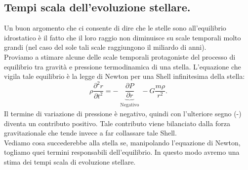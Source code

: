 \subsection{Tempi scala dell'evoluzione stellare.}
\label{subsec:Equilibrio idrostatico stellare.}

Un buon argomento che ci consente di dire che le stelle sono all'equilibrio idrostatico è il fatto che il loro raggio non diminuisce su scale temporali molto grandi (nel caso del sole tali scale raggiungono il miliardo di anni). \\
Proviamo a stimare alcune delle scale temporali protagoniste del processo di equilibrio tra gravità e pressione termodinamica di una stella. L'equazione che vigila tale equilibrio è la legge di Newton per una Shell infinitesima della stella:
\[
	\rho\frac{\partial^2r}{\partial t^2} 
	=
	-\underbrace{\frac{\partial P}{\partial r}}_
	{\substack{\text{Negativo}}}
	-G \frac{m\rho}{r^2}
.\] 
Il termine di variazione di pressione è negativo, quindi con l'ulteriore segno (-) diventa un contributo positivo. Tale contributo viene bilanciato dalla forza gravitazionale che tende invece a far collassare tale Shell. \\
Vediamo cosa succederebbe alla stella se, manipolando l'equazione di Newton, togliamo quei termini responsabili dell'equilibrio. In questo modo avremo una stima dei tempi scala di evoluzione stellare.
